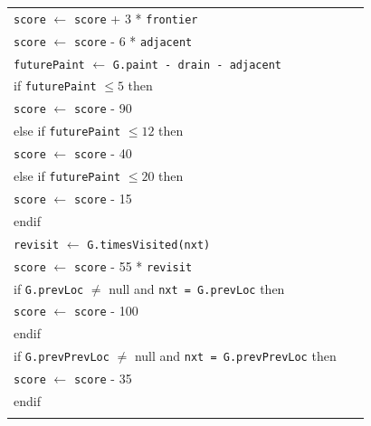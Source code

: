 \documentclass{article}
\newenvironment{pseudobox}
{
\centering
\begin{longtable}{|p{0.94\linewidth}|}
\hline
}
{
\\ \hline
\end{longtable}
\vspace{0.05cm}
}
\begin{document}
\begin{enumerate}[label=\alph*.]
\begin{enumerate}[label=\alph*.]
\begin{pseudobox}
\hspace*{1.5em}\texttt{score} $\leftarrow$ \texttt{score} + 3 * \texttt{frontier} \\
\hspace*{1.5em}\texttt{score} $\leftarrow$ \texttt{score} - 6 * \texttt{adjacent} \\

\hspace*{1.5em}\texttt{futurePaint} $\leftarrow$ \texttt{G.paint - drain - adjacent} \\
\hspace*{1.5em}if \texttt{futurePaint} $\leq 5$ then \\
\hspace*{3em}\texttt{score} $\leftarrow$ \texttt{score} - 90 \\
\hspace*{1.5em}else if \texttt{futurePaint} $\leq 12$ then \\
\hspace*{3em}\texttt{score} $\leftarrow$ \texttt{score} - 40 \\
\hspace*{1.5em}else if \texttt{futurePaint} $\leq 20$ then \\
\hspace*{3em}\texttt{score} $\leftarrow$ \texttt{score} - 15 \\
\hspace*{1.5em}endif \\

\hspace*{1.5em}\texttt{revisit} $\leftarrow$ \texttt{G.timesVisited(nxt)} \\
\hspace*{1.5em}\texttt{score} $\leftarrow$ \texttt{score} - 55 * \texttt{revisit} \\

\hspace*{1.5em}if \texttt{G.prevLoc} $\neq$ null and \texttt{nxt = G.prevLoc} then \\
\hspace*{3em}\texttt{score} $\leftarrow$ \texttt{score} - 100 \\
\hspace*{1.5em}endif \\

\hspace*{1.5em}if \texttt{G.prevPrevLoc} $\neq$ null and \texttt{nxt = G.prevPrevLoc} then \\
\hspace*{3em}\texttt{score} $\leftarrow$ \texttt{score} - 35 \\
\hspace*{1.5em}endif \\


\end{pseudobox}
\end{enumerate}
\end{enumerate}
\end{document}
